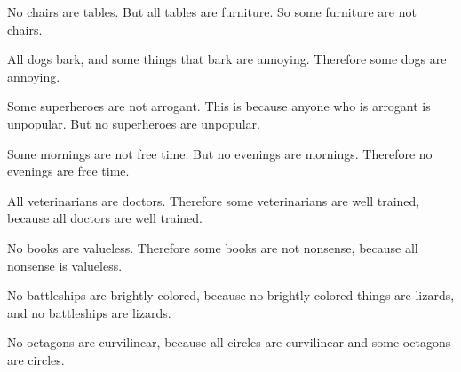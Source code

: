 \begin{exercises} 

\item No chairs are tables. But all tables are furniture. So some furniture are not chairs.


  
 
\item All dogs bark, and some things that bark are annoying. Therefore some dogs are annoying.

 
\item Some superheroes are not arrogant. This is because anyone who is arrogant is unpopular. But no superheroes are unpopular.

 
 
\item Some mornings are not free time. But no evenings are mornings. Therefore no evenings are free time.

 
\item All veterinarians are doctors. Therefore some veterinarians are well trained, because all doctors are well trained.


\item No books are valueless. Therefore some books are not nonsense, because all nonsense is valueless.



 \item No battleships are brightly colored, because no brightly colored things are lizards, and no battleships are lizards.

\item No octagons are curvilinear, because all circles are curvilinear and some octagons are circles.



\end{exercises}
